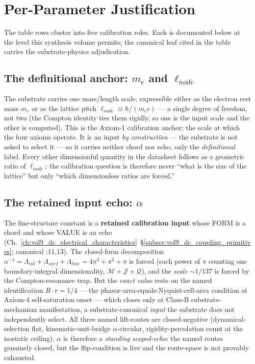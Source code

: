 \section{Per-Parameter Justification}
\label{sec:vol9_calib_per_param}

The table rows cluster into five calibration roles. Each is documented below at the level this synthesis volume permits; the canonical leaf cited in the table carries the substrate-physics adjudication.

\subsection{The definitional anchor: $m_e$ and $\ell_{node}$}
\label{subsec:vol9_calib_anchor}

The substrate carries one mass/length scale, expressible either as the electron rest mass $m_e$ or as the lattice pitch $\ell_{node} \equiv \hbar/(m_e c)$ --- a single degree of freedom, not two (the Compton identity ties them rigidly, so one is the input scale and the other is computed). This is the Axiom-1 calibration anchor: the scale at which the four axioms operate. It is an input \emph{by construction} --- the substrate is not asked to select it --- so it carries neither chord nor echo, only the \emph{definitional} label. Every other dimensionful quantity in the datasheet follows as a geometric ratio of $\ell_{node}$; the calibration question is therefore never ``what is the size of the lattice'' but only ``which dimensionless ratios are forced.''

\subsection{The retained input echo: $\alpha$}
\label{subsec:vol9_calib_alpha}

The fine-structure constant is a \textbf{retained calibration input} whose FORM is a chord and whose VALUE is an echo (Ch.~\ref{ch:vol9_dc_electrical_characteristics}~\S\ref{subsec:vol9_dc_coupling_primitives}; canonical :11,13). The closed-form decomposition $\alpha^{-1} = \Lambda_{vol} + \Lambda_{surf} + \Lambda_{line} = 4\pi^3 + \pi^2 + \pi$ is forced (each power of $\pi$ counting one boundary-integral dimensionality, $\mathcal{M} + \mathcal{J} + \mathcal{Q}$), and the \emph{scale} $\sim 1/137$ is forced by the Compton-resonance trap. But the \emph{exact value} rests on the named identification $R\cdot r = 1/4$ --- the phasor-area-equals-Nyquist-cell-area condition at Axiom-4 self-saturation onset --- which closes only at Class-B substrate-mechanism manifestation, a substrate-canonical \emph{input} the substrate does not independently select. All three named lift-routes are closed-negative (dynamical-selection flat, kinematic-unit-bridge $\alpha$-circular, rigidity-percolation count at the isostatic ceiling). $\alpha$ is therefore a \emph{standing scoped-echo}: the named routes genuinely closed, but the flip-condition is live and the route-space is not provably exhausted.

